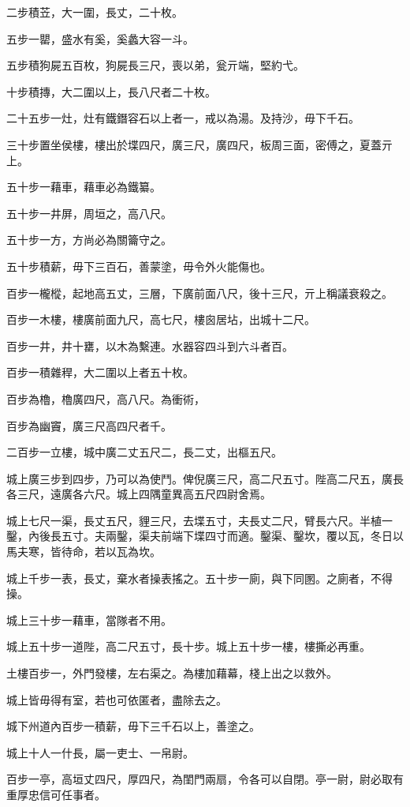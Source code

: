 \begin{pinyinscope}
二步積苙，大一圍，長丈，二十枚。

五步一罌，盛水有奚，奚蠡大容一斗。

五步積狗屍五百枚，狗屍長三尺，喪以弟，瓮亓端，堅約弋。

十步積摶，大二圍以上，長八尺者二十枚。

二十五步一灶，灶有鐵鐕容石以上者一，戒以為湯。及持沙，毋下千石。

三十步置坐侯樓，樓出於堞四尺，廣三尺，廣四尺，板周三面，密傅之，夏蓋亓上。

五十步一藉車，藉車必為鐵纂。

五十步一井屏，周垣之，高八尺。

五十步一方，方尚必為關籥守之。

五十步積薪，毋下三百石，善蒙塗，毋令外火能傷也。

百步一櫳樅，起地高五丈，三層，下廣前面八尺，後十三尺，亓上稱議衰殺之。

百步一木樓，樓廣前面九尺，高七尺，樓囪居坫，出城十二尺。

百步一井，井十罋，以木為繫連。水器容四斗到六斗者百。

百步一積雜稈，大二圍以上者五十枚。

百步為櫓，櫓廣四尺，高八尺。為衝術，

百步為幽竇，廣三尺高四尺者千。

二百步一立樓，城中廣二丈五尺二，長二丈，出樞五尺。

城上廣三步到四步，乃可以為使鬥。俾倪廣三尺，高二尺五寸。陛高二尺五，廣長各三尺，遠廣各六尺。城上四隅童異高五尺四尉舍焉。

城上七尺一渠，長丈五尺，貍三尺，去堞五寸，夫長丈二尺，臂長六尺。半植一鑿，內後長五寸。夫兩鑿，渠夫前端下堞四寸而適。鑿渠、鑿坎，覆以瓦，冬日以馬夫寒，皆待命，若以瓦為坎。

城上千步一表，長丈，棄水者操表搖之。五十步一廁，與下同圂。之廁者，不得操。

城上三十步一藉車，當隊者不用。

城上五十步一道陛，高二尺五寸，長十步。城上五十步一樓，樓撕必再重。

土樓百步一，外門發樓，左右渠之。為樓加藉幕，棧上出之以救外。

城上皆毋得有室，若也可依匿者，盡除去之。

城下州道內百步一積薪，毋下三千石以上，善塗之。

城上十人一什長，屬一吏士、一帛尉。

百步一亭，高垣丈四尺，厚四尺，為閨門兩扇，令各可以自閉。亭一尉，尉必取有重厚忠信可任事者。


\end{pinyinscope}
